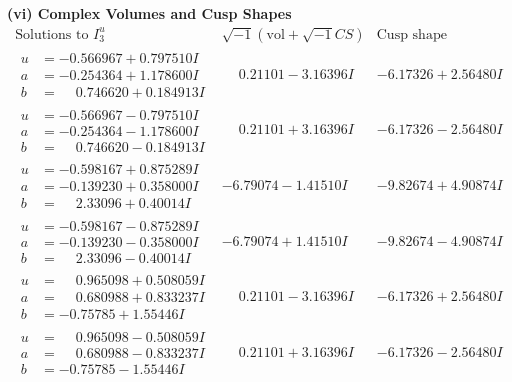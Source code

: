 \documentclass[1p]{elsarticle_modified}
\theoremstyle{definition}
\newcommand{\I}{\sqrt{-1}}
\begin{document}
\newpage\flushleft \textbf{(vi) Complex Volumes and Cusp Shapes}
$$\begin{array}{c|c|c}  
\text{Solutions to }I^u_{3}& \I (\text{vol} + \sqrt{-1}CS) & \text{Cusp shape}\\
 \hline 
\begin{aligned}
u &= -0.566967 + 0.797510 I \\
a &= -0.254364 + 1.178600 I \\
b &= \phantom{-}0.746620 + 0.184913 I\end{aligned}
 & \phantom{-}0.21101 - 3.16396 I & -6.17326 + 2.56480 I \\ \hline\begin{aligned}
u &= -0.566967 - 0.797510 I \\
a &= -0.254364 - 1.178600 I \\
b &= \phantom{-}0.746620 - 0.184913 I\end{aligned}
 & \phantom{-}0.21101 + 3.16396 I & -6.17326 - 2.56480 I \\ \hline\begin{aligned}
u &= -0.598167 + 0.875289 I \\
a &= -0.139230 + 0.358000 I \\
b &= \phantom{-}2.33096 + 0.40014 I\end{aligned}
 & -6.79074 - 1.41510 I & -9.82674 + 4.90874 I \\ \hline\begin{aligned}
u &= -0.598167 - 0.875289 I \\
a &= -0.139230 - 0.358000 I \\
b &= \phantom{-}2.33096 - 0.40014 I\end{aligned}
 & -6.79074 + 1.41510 I & -9.82674 - 4.90874 I \\ \hline\begin{aligned}
u &= \phantom{-}0.965098 + 0.508059 I \\
a &= \phantom{-}0.680988 + 0.833237 I \\
b &= -0.75785 + 1.55446 I\end{aligned}
 & \phantom{-}0.21101 - 3.16396 I & -6.17326 + 2.56480 I \\ \hline\begin{aligned}
u &= \phantom{-}0.965098 - 0.508059 I \\
a &= \phantom{-}0.680988 - 0.833237 I \\
b &= -0.75785 - 1.55446 I\end{aligned}
 & \phantom{-}0.21101 + 3.16396 I & -6.17326 - 2.56480 I \\ \hline\begin{aligned}

\end{aligned}
\end{array}$$
\end{document}
